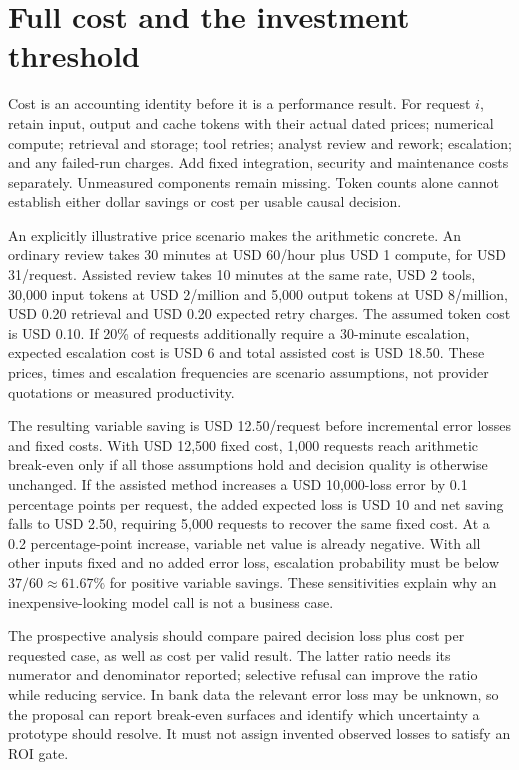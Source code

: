 \hypertarget{full-cost-and-the-investment-threshold}{%
\section{Full cost and the investment
threshold}\label{full-cost-and-the-investment-threshold}}

\label{exec14:cost-development}

Cost is an accounting identity before it is a performance result. For
request \(i\), retain input, output and cache tokens with their actual
dated prices; numerical compute; retrieval and storage; tool retries;
analyst review and rework; escalation; and any failed-run charges. Add
fixed integration, security and maintenance costs separately. Unmeasured
components remain missing. Token counts alone cannot establish either
dollar savings or cost per usable causal decision.

An explicitly illustrative price scenario makes the arithmetic concrete.
An ordinary review takes 30 minutes at USD 60/hour plus USD 1 compute,
for USD 31/request. Assisted review takes 10 minutes at the same rate,
USD 2 tools, 30,000 input tokens at USD 2/million and 5,000 output
tokens at USD 8/million, USD 0.20 retrieval and USD 0.20 expected retry
charges. The assumed token cost is USD 0.10. If 20\% of requests
additionally require a 30-minute escalation, expected escalation cost is
USD 6 and total assisted cost is USD 18.50. These prices, times and
escalation frequencies are scenario assumptions, not provider quotations
or measured productivity.

The resulting variable saving is USD 12.50/request before incremental
error losses and fixed costs. With USD 12,500 fixed cost, 1,000 requests
reach arithmetic break-even only if all those assumptions hold and
decision quality is otherwise unchanged. If the assisted method
increases a USD 10,000-loss error by 0.1 percentage points per request,
the added expected loss is USD 10 and net saving falls to USD 2.50,
requiring 5,000 requests to recover the same fixed cost. At a 0.2
percentage-point increase, variable net value is already negative. With
all other inputs fixed and no added error loss, escalation probability
must be below \(37/60\approx61.67\%\) for positive variable savings.
These sensitivities explain why an inexpensive-looking model call is not
a business case.\citep{exec14_evaluation_oracle}

The prospective analysis should compare paired decision loss plus cost
per requested case, as well as cost per valid result. The latter ratio
needs its numerator and denominator reported; selective refusal can
improve the ratio while reducing service. In bank data the relevant
error loss may be unknown, so the proposal can report break-even
surfaces and identify which uncertainty a prototype should resolve. It
must not assign invented observed losses to satisfy an ROI gate.

